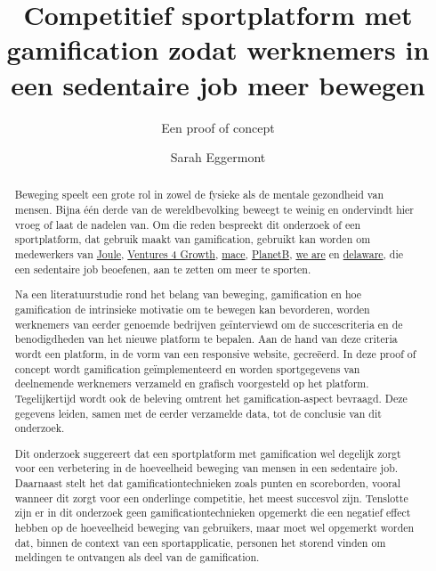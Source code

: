 \documentclass[a0,portrait]{hogent-poster}
\title{Competitief sportplatform met gamification zodat werknemers in een sedentaire job meer bewegen}
\subtitle{Een proof of concept}
\author{Sarah Eggermont}
\begin{document}
\maketitle

\begin{abstract}

Beweging speelt een grote rol in zowel de fysieke als de mentale gezondheid van mensen. Bijna één derde van de wereldbevolking beweegt te weinig en ondervindt hier vroeg of laat de nadelen van. Om die reden bespreekt dit onderzoek of een sportplatform, dat gebruik maakt van gamification, gebruikt kan worden om medewerkers van \href{https://en.joule.be/}{Joule}, \href{https://www.ventures4growth.com/en}{Ventures 4 Growth}, \href{https://www.mace-legal.com/}{mace}, \href{https://planetb.life/en}{PlanetB}, \href{https://www.we-are.be/}{we are} en \href{https://www.delaware.pro/en-be}{delaware}, die een sedentaire job beoefenen, aan te zetten om meer te sporten.

Na een literatuurstudie rond het belang van beweging, gamification en hoe gamification de intrinsieke motivatie om te bewegen kan bevorderen, worden werknemers van eerder genoemde bedrijven geïnterviewd om de succescriteria en de benodigdheden van het nieuwe platform te bepalen. Aan de hand van deze criteria wordt een platform, in de vorm van een responsive website, gecreëerd. In deze proof of concept wordt gamification geïmplementeerd en worden sportgegevens van deelnemende werknemers verzameld en grafisch voorgesteld op het platform. Tegelijkertijd wordt ook de beleving omtrent het gamification-aspect bevraagd. Deze gegevens leiden, samen met de eerder verzamelde data, tot de conclusie van dit onderzoek.

Dit onderzoek suggereert dat een sportplatform met gamification wel degelijk zorgt voor een verbetering in de hoeveelheid beweging van mensen in een sedentaire job. Daarnaast stelt het dat gamificationtechnieken zoals punten en scoreborden, vooral wanneer dit zorgt voor een onderlinge competitie, het meest succesvol zijn. Tenslotte zijn er in dit onderzoek geen gamificationtechnieken opgemerkt die een negatief effect hebben op de hoeveelheid beweging van gebruikers, maar moet wel opgemerkt worden dat, binnen de context van een sportapplicatie, personen het storend vinden om meldingen te ontvangen als deel van de gamification.

\end{abstract}
\end{document}
